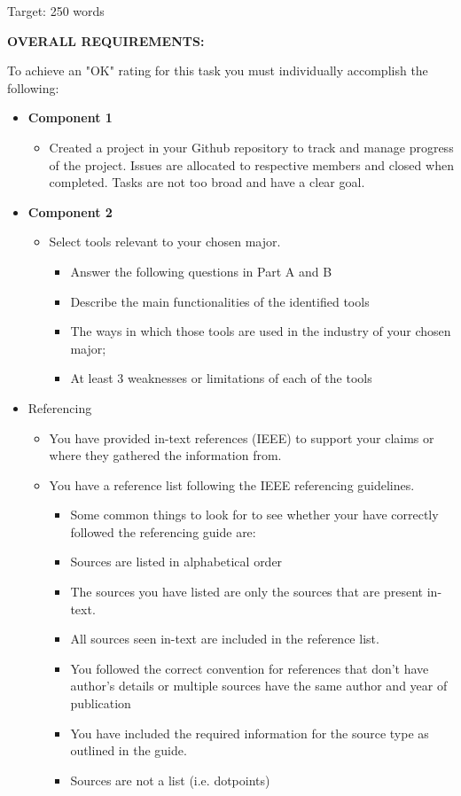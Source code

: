\documentclass[a4paper, 11pt]{report}
\begin{document}
Target: 250 words

\vspace{6ex}

\textbf{OVERALL REQUIREMENTS:}

To achieve an "OK" rating for this task you must individually accomplish the following:
\begin{itemize}
\item \textbf{Component 1}
	\begin{itemize}
	\item Created a project in your Github repository to track and manage progress of the project. Issues are allocated to respective members and closed when completed. Tasks are not too broad and have a clear goal.
    \end{itemize}
		
\item \textbf{Component 2}
	\begin{itemize}
	\item Select tools relevant to your chosen major. 
        \begin{itemize}
            \item Answer the following questions in Part A and B
            \item Describe the main functionalities of the identified tools
            \item The ways in which those tools are used in the industry of your chosen major;
            \item At least 3 weaknesses or limitations of each of the tools
        \end{itemize}
    \end{itemize}
\item Referencing
	\begin {itemize}
	\item You have provided in-text references (IEEE) to support your claims or where they gathered the information from.
	\item You have a reference list following the IEEE referencing guidelines.
		\begin{itemize}
    		\item Some common things to look for to see whether your have correctly followed the referencing guide are:
    		\item Sources are listed in alphabetical order
    		\item The sources you have listed are only the sources that are present in-text.
    		\item All sources seen in-text are included in the reference list.
    		\item You followed the correct convention for references that don’t have author’s details or multiple sources have the same author and year of publication
    		\item You have included the required information for the source type as outlined in the guide.
    		\item Sources are not a list (i.e. dotpoints)
		\end{itemize}
	\end{itemize}
\end{itemize}
\end{document}
